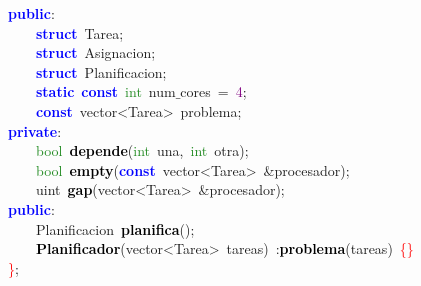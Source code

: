 \mbox{}\textbf{\textcolor{Blue}{public}}\textcolor{BrickRed}{:} \\
\mbox{}\ \ \ \ \textbf{\textcolor{Blue}{struct}}\ \textcolor{TealBlue}{Tarea}\textcolor{BrickRed}{;} \\
\mbox{}\ \ \ \ \textbf{\textcolor{Blue}{struct}}\ \textcolor{TealBlue}{Asignacion}\textcolor{BrickRed}{;} \\
\mbox{}\ \ \ \ \textbf{\textcolor{Blue}{struct}}\ \textcolor{TealBlue}{Planificacion}\textcolor{BrickRed}{;} \\
\mbox{}\ \ \ \ \textbf{\textcolor{Blue}{static}}\ \textbf{\textcolor{Blue}{const}}\ \textcolor{ForestGreen}{int}\ num$\_$cores\ \textcolor{BrickRed}{=}\ \textcolor{Purple}{4}\textcolor{BrickRed}{;} \\
\mbox{}\ \ \ \ \textbf{\textcolor{Blue}{const}}\ \textcolor{TealBlue}{vector\textless{}Tarea\textgreater{}}\ problema\textcolor{BrickRed}{;} \\
\mbox{}\textbf{\textcolor{Blue}{private}}\textcolor{BrickRed}{:} \\
\mbox{}\ \ \ \ \textcolor{ForestGreen}{bool}\ \textbf{\textcolor{Black}{depende}}\textcolor{BrickRed}{(}\textcolor{ForestGreen}{int}\ una\textcolor{BrickRed}{,}\ \textcolor{ForestGreen}{int}\ otra\textcolor{BrickRed}{);} \\
\mbox{}\ \ \ \ \textcolor{ForestGreen}{bool}\ \textbf{\textcolor{Black}{empty}}\textcolor{BrickRed}{(}\textbf{\textcolor{Blue}{const}}\ \textcolor{TealBlue}{vector\textless{}Tarea\textgreater{}}\ \textcolor{BrickRed}{\&}procesador\textcolor{BrickRed}{);} \\
\mbox{}\ \ \ \ \textcolor{TealBlue}{uint}\ \textbf{\textcolor{Black}{gap}}\textcolor{BrickRed}{(}\textcolor{TealBlue}{vector\textless{}Tarea\textgreater{}}\ \textcolor{BrickRed}{\&}procesador\textcolor{BrickRed}{);} \\
\mbox{}\textbf{\textcolor{Blue}{public}}\textcolor{BrickRed}{:} \\
\mbox{}\ \ \ \ \textcolor{TealBlue}{Planificacion}\ \textbf{\textcolor{Black}{planifica}}\textcolor{BrickRed}{();} \\
\mbox{}\ \ \ \ \textbf{\textcolor{Black}{Planificador}}\textcolor{BrickRed}{(}\textcolor{TealBlue}{vector\textless{}Tarea\textgreater{}}\ tareas\textcolor{BrickRed}{)}\ \textcolor{BrickRed}{:}\textbf{\textcolor{Black}{problema}}\textcolor{BrickRed}{(}tareas\textcolor{BrickRed}{)}\ \textcolor{Red}{\{\}} \\
\mbox{}\textcolor{Red}{\}}\textcolor{BrickRed}{;} \\
